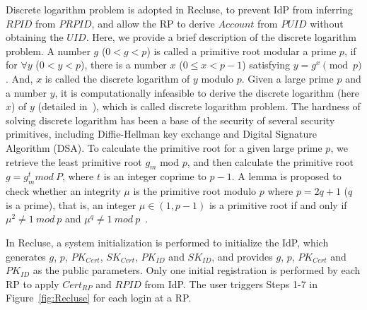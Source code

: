 Discrete logarithm problem is adopted in Recluse, to prevent IdP from inferring $RPID$ from $PRPID$, and allow the RP to derive $Account$ from $PUID$ without obtaining the $UID$.
Here, we provide a brief description of the discrete logarithm problem.
A number $g$ ($0<g<p$) is called a primitive root modular a prime $p$, if for ${\forall}y$ ($0<y<p$), there is a  number $x$ ($0\le x <p-1$) satisfying $y=g^x \pmod p$.
And, $x$ is called the discrete logarithm of $y$ modulo $p$. Given a large prime $p$ and a number $y$, it is computationally infeasible to derive the discrete logarithm (here $x$) of $y$ (detailed in~\cite{WXWM}), which is called discrete logarithm problem. The hardness of solving discrete logarithm has been a base of the security of several security primitives, including Diffie-Hellman key exchange and Digital Signature Algorithm (DSA).
To calculate the primitive root for a given large prime $p$,  we retrieve the least primitive root $g_m$  mod $p$,
and then calculate the primitive root $g = g_{m}^{t} mod \ P$, where $t$ is an integer coprime to $p-1$.
A lemma is proposed to check whether an integrity $\mu$ is the primitive root modulo $p$ where $p=2q+1$ ($q$ is a prime), that is,  an integer $\mu \in (1, p-1)$ is a primitive root if and only if $\mu^2\neq 1 \ mod \ p$ and $\mu^q\neq 1 \ mod \ p$~\cite{Shoup,Wang}.


In Recluse, a system initialization is performed to initialize the IdP, which generates $g$, $p$, $PK_{Cert}$, $SK_{Cert}$, $PK_{ID}$ and $SK_{ID}$, 
and provides  $g$, $p$, $PK_{Cert}$ and $PK_{ID}$ as the public parameters.
Only one initial registration is performed by each RP to apply  $Cert_{RP}$ and $RPID$ from IdP.
The user triggers Steps 1-7 in Figure~\ref{fig:Recluse} for each login at a RP.

